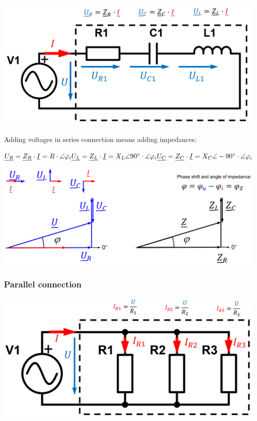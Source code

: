 \documentclass{article}
\begin{document}

\begin{center}
    \includegraphics[width=.5\textwidth]{media/series_impedances.png}
\end{center}


\newpage
Adding voltages in series connection means adding impedances:

$\underline{U_R} = \underline{Z_R} \cdot \underline{I} = R\cdot\angle\varphi_i\\\\
\underline{U_L} = \underline{Z_L} \cdot \underline{I} = X_L\angle 90^{\circ} \cdot\angle\varphi_i\\\\
\underline{U_C} = \underline{Z_C} \cdot \underline{I} = X_C\angle -90^{\circ} \cdot\angle\varphi_i$

\begin{center}
    \includegraphics[width=.8\textwidth]{media/voltage_impedance.png}
\end{center}


\subsubsection{Parallel connection}
\begin{center}
    \includegraphics[width=.5\textwidth]{media/parallel_resistances.png}
\end{center}
\end{document}
